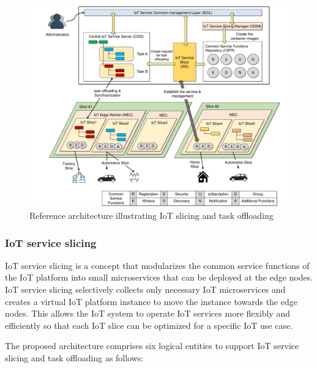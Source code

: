\begin{figure}[tb!]
\centering
\includegraphics[width=\textwidth]{figures/fig_IoT_slicing_architecture.pdf}
\caption{Reference architecture illustrating IoT slicing and task offloading}
\label{fig:iot_slicing_architecture}
\end{figure}

\subsubsection{IoT service slicing}
IoT service slicing is a concept that modularizes the common service functions of the IoT platform into small microservices that can be deployed at the edge nodes. IoT service slicing selectively collects only necessary IoT microservices and creates a virtual IoT platform instance to move the instance towards the edge nodes. This allows the IoT system to operate IoT services more flexibly and efficiently so that each IoT slice can be optimized for a specific IoT use case. 

The proposed architecture comprises six logical entities to support IoT service slicing and task offloading as follows:

